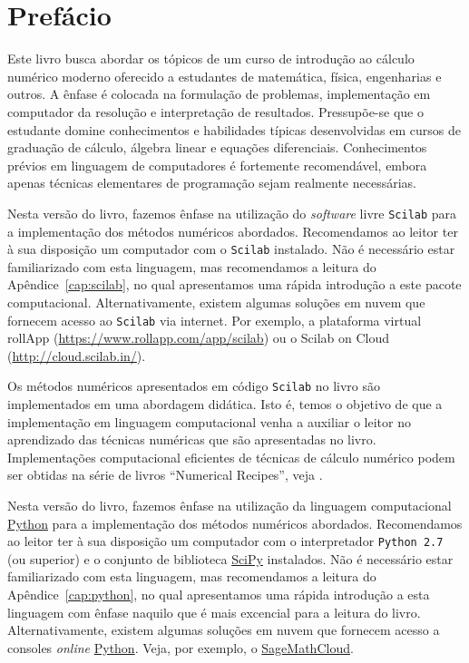 
\chapter*{Prefácio}

Este livro busca abordar os tópicos de um curso de introdução ao cálculo numérico moderno oferecido a estudantes de matemática, física, engenharias e outros. A ênfase é colocada na formulação de problemas, implementação em computador da resolução e interpretação de resultados. Pressupõe-se que o estudante domine conhecimentos e habilidades típicas desenvolvidas em cursos de graduação de cálculo, álgebra linear e equações diferenciais. Conhecimentos prévios em linguagem de computadores é fortemente recomendável, embora apenas técnicas elementares de programação sejam realmente necessárias.

\ifisscilab
Nesta versão do livro, fazemos ênfase na utilização do \emph{software} livre \verb+Scilab+ para a implementação dos métodos numéricos abordados. Recomendamos ao leitor ter à sua disposição um computador com o \verb+Scilab+ instalado. Não é necessário estar familiarizado com esta linguagem, mas recomendamos a leitura do Apêndice~\ref{cap:scilab}, no qual apresentamos uma rápida introdução a este pacote computacional. Alternativamente, existem algumas soluções em nuvem que fornecem acesso ao \verb+Scilab+ via internet. Por exemplo, a plataforma virtual rollApp (\url{https://www.rollapp.com/app/scilab}) ou o Scilab on Cloud (\url{http://cloud.scilab.in/}).

Os métodos numéricos apresentados em código \verb+Scilab+ no livro são implementados em uma abordagem didática. Isto é, temos o objetivo de que a implementação em linguagem computacional venha a auxiliar o leitor no aprendizado das técnicas numéricas que são apresentadas no livro. Implementações computacional eficientes de técnicas de cálculo numérico podem ser obtidas na série de livros ``Numerical Recipes'', veja \cite{numerical}.  
\fi

\ifispython
Nesta versão do livro, fazemos ênfase na utilização da linguagem computacional \href{https://www.python.org/}{Python} para a implementação dos métodos numéricos abordados. Recomendamos ao leitor ter à sua disposição um computador com o interpretador \verb+Python 2.7+ (ou superior) e o conjunto de biblioteca \href{https://www.scipy.org/}{SciPy} instalados. Não é necessário estar familiarizado com esta linguagem, mas recomendamos a leitura do Apêndice~\ref{cap:python}, no qual apresentamos uma rápida introdução a esta linguagem com ênfase naquilo que é mais excencial para a leitura do livro. Alternativamente, existem algumas soluções em nuvem que fornecem acesso a consoles {\it online} \href{https://www.python.org/}{Python}. Veja, por exemplo, o \href{https://cloud.sagemath.com/}{SageMathCloud}.

